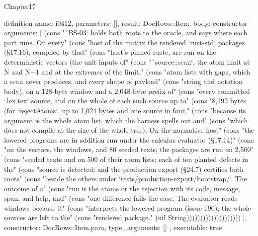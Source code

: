 \begin{lexlean}{Chapter17}
\begin{semanticmodule}
definition{
  name: i0412,
  parameters: [],
  result: DocRows::Item,
  body: constructor{
    arguments: [
      (cons "`BS-03` holds both roots to the oracle, and says where each part runs. On every" (cons "host of the matrix the rendered `rust-std` packages (§17.16), compiled by that" (cons "host's pinned rustc, are run on the deterministic vectors (the unit inputs of" (cons "`source::scan`, the atom limit at N and N+1 and at the extremes of the limit," (cons "atom lists with gaps, which a scan never produces, and every shape of payload" (cons "string and notation body), on a 128-byte window and a 2,048-byte prefix of" (cons "every committed `.lex.tex` source, and on the whole of each such source up to" (cons "8,192 bytes (for `rejectAtoms`, up to 1,024 bytes and one source in four," (cons "because its argument is the whole atom list, which the harness spells out and" (cons "which does not compile at the size of the whole tree). On the normative host" (cons "the lowered programs are in addition run under the calculus evaluator (§17.14)" (cons "on the vectors, the windows, and 80 seeded texts; the packages are run on 2,500" (cons "seeded texts and on 500 of their atom lists; each of ten planted defects in the" (cons "source is detected; and the production export (§24.7) certifies both roots" (cons "beside the others under `tests/production-export/bootstrap/`. The outcome of a" (cons "run is the atoms or the rejection with its code, message, span, and help, and" (cons "one difference fails the case. The evaluator reads windows because it" (cons "interprets the lowered program (issue 190); the whole sources are left to the" (cons "rendered package." (nil String))))))))))))))))))))
    ],
    constructor: DocRows::Item.para,
    type_arguments: []
  },
  executable: true
}


\end{semanticmodule}
\end{lexlean}
